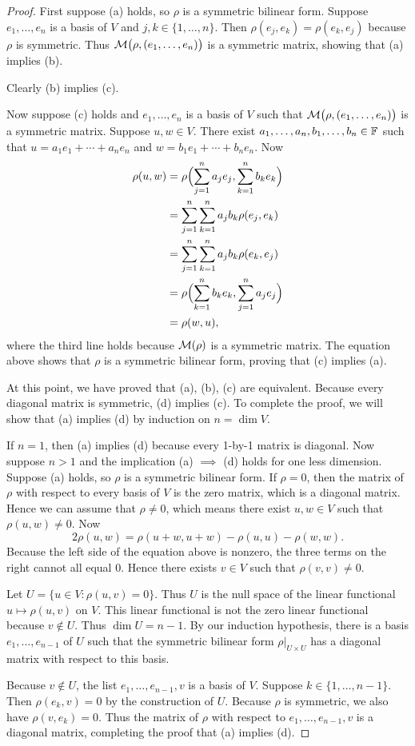 \begin{proof}
First suppose (a) holds, so $\rho$ is a symmetric bilinear form. Suppose
$e_1,\dots,e_n$ is a basis of $V$ and $j,k\in\{1,\dots,n\}$. Then
$\rho(e_j,e_k)=\rho(e_k,e_j)$ because $\rho$ is symmetric. Thus
$\mathcal{M}\bigl(\rho,(e_1,\dots,e_n)\bigr)$ is a symmetric matrix, showing that (a)
implies (b).

Clearly (b) implies (c).

Now suppose (c) holds and $e_1,\dots,e_n$ is a basis of $V$ such that
$\mathcal{M}\bigl(\rho,(e_1,\dots,e_n)\bigr)$ is a symmetric matrix. Suppose
$u,w\in V$. There exist $a_1,\dots,a_n,b_1,\dots,b_n\in\mathbb{F}$ such that
$u=a_1e_1+\cdots+a_ne_n$ and $w=b_1e_1+\cdots+b_ne_n$. Now
\begin{align*}
\rho(u,w) &= \rho\Bigl(\sum_{j=1}^n a_je_j,\sum_{k=1}^n b_ke_k\Bigr)\\
  &= \sum_{j=1}^n\sum_{k=1}^n a_jb_k\rho(e_j,e_k)\\
  &= \sum_{j=1}^n\sum_{k=1}^n a_jb_k\rho(e_k,e_j)\\
  &= \rho\Bigl(\sum_{k=1}^n b_ke_k,\sum_{j=1}^n a_je_j\Bigr)\\
  &= \rho(w,u),
\end{align*}
where the third line holds because $\mathcal{M}(\rho)$ is a symmetric matrix. The
equation above shows that $\rho$ is a symmetric bilinear form, proving that (c)
implies (a).

At this point, we have proved that (a), (b), (c) are equivalent. Because every
diagonal matrix is symmetric, (d) implies (c). To complete the proof, we will
show that (a) implies (d) by induction on $n=\dim V$.

If $n=1$, then (a) implies (d) because every 1-by-1 matrix is diagonal. Now
suppose $n>1$ and the implication (a) $\implies$ (d) holds for one less
dimension. Suppose (a) holds, so $\rho$ is a symmetric bilinear form. If
$\rho=0$, then the matrix of $\rho$ with respect to every basis of $V$ is the
zero matrix, which is a diagonal matrix. Hence we can assume that $\rho\ne0$,
which means there exist $u,w\in V$ such that $\rho(u,w)\ne0$. Now
\[ 2\rho(u,w) = \rho(u+w,u+w)-\rho(u,u)-\rho(w,w). \]
Because the left side of the equation above is nonzero, the three terms on the
right cannot all equal $0$. Hence there exists $v\in V$ such that
$\rho(v,v)\ne0$.

Let $U=\{u\in V : \rho(u,v)=0\}$. Thus $U$ is the null space of the linear
functional $u\mapsto\rho(u,v)$ on $V$. This linear functional is not the zero
linear functional because $v\notin U$. Thus $\dim U=n-1$. By our induction
hypothesis, there is a basis $e_1,\dots,e_{n-1}$ of $U$ such that the symmetric
bilinear form $\rho|_{U\times U}$ has a diagonal matrix with respect to this
basis.

Because $v\notin U$, the list $e_1,\dots,e_{n-1},v$ is a basis of $V$. Suppose
$k\in\{1,\dots,n-1\}$. Then $\rho(e_k,v)=0$ by the construction of $U$. Because
$\rho$ is symmetric, we also have $\rho(v,e_k)=0$. Thus the matrix of $\rho$
with respect to $e_1,\dots,e_{n-1},v$ is a diagonal matrix, completing the proof
that (a) implies (d).
\end{proof}

